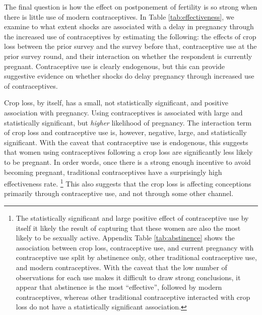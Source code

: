 \documentclass[letterpaper,12pt]{article}
\begin{document}


The final question is how the effect on postponement of fertility 
is so strong when there is little use of modern contraceptives.
In Table \ref{tab:effectiveness}, we examine to what extent shocks are
associated with a delay in pregnancy through the increased use of 
contraceptives by estimating the following: 
the effects of crop loss between the prior survey and the
survey before that, contraceptive use at the prior survey round, and their
interaction on whether the respondent is currently pregnant.
Contraceptive use is clearly endogenous, but this can provide 
suggestive evidence on whether shocks do delay
pregnancy through increased use of contraceptives. 




Crop loss, by itself, has a small, not statistically significant,
and positive association with pregnancy.
Using contraceptives is associated with large and statistically 
significant, but \emph{higher} likelihood of pregnancy.
The interaction term of crop loss and contraceptive use is,
however, negative, large, and statistically significant. 
With the caveat that contraceptive use is endogenous, this suggests
that women using contraceptives following a crop loss are significantly 
less likely to be pregnant. 
In order words, once there is a strong enough incentive to avoid
becoming pregnant, traditional contraceptives have a surprisingly high
effectiveness rate.%
\footnote{
The statistically significant and large positive effect of 
contraceptive use by itself it likely the result of capturing
that these women are also the most likely to be sexually active.
Appendix Table \ref{tab:abstinence} shows the association 
between crop loss, contraceptive use, and current pregnancy with 
contraceptive use split by abstinence only, other traditional
contraceptive use, and modern contraceptives.
With the caveat that the low number of observations for each use 
makes it difficult to draw strong conclusions, it appear that
abstinence is the most ``effective'', followed by modern
contraceptives, whereas other traditional contraceptive interacted
with crop loss do not have a statistically significant association.
}
This also suggests that the crop loss is affecting conceptions primarily 
through contraceptive use, and not through some other channel.
\end{document}

